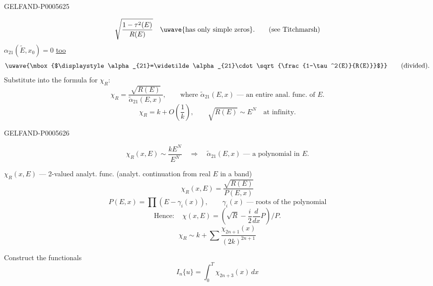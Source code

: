 \begin{GelfandAdjacentEvidence}{GELFAND-P000562}{5}

\[
\sqrt{\frac{1-\tau^2(E)}{R(E)}}\quad
\text{\uwave{has only simple zeros}.}\qquad(\text{see Titchmarsh})
\]
\underline{\(\alpha_{21}(\widetilde E,x_0)=0\)} \underline{too}
\[
\uwave{\mbox{$\displaystyle\alpha_{21}=\widetilde\alpha_{21}\cdot
\sqrt{\frac{1-\tau^2(E)}{R(E)}}$}}\qquad(\text{divided}).
\]
Substitute into the formula for \(\chi_R\):
\[
\chi_R=\frac{\sqrt{R(E)}}{\widetilde\alpha_{21}(E,x)},
\qquad\text{where }\widetilde\alpha_{21}(E,x)\text{ — an entire anal. func. of }E.
\]
\[
\chi_R=k+O\left(\frac1k\right),\qquad
\sqrt{R(E)}\sim E^N\quad\text{at infinity}.
\]
\end{GelfandAdjacentEvidence}
\begin{GelfandAdjacentEvidence}{GELFAND-P000562}{6}

\[
\chi_R(x,E)\sim\frac{kE^N}{E^N}\quad\Rightarrow\quad
\widetilde\alpha_{21}(E,x)\text{ — a polynomial in }E.
\]
\hfill{}\par
\(\chi_R(x,E)\) — 2-valued analyt. func. (analyt. continuation from real \(E\) in a band)
\[
\chi_R(x,E)=\frac{\sqrt{R(E)}}{P(E,x)}
\]
\[
P(E,x)=\prod(E-\gamma_i(x)),\qquad
\gamma_i(x)\text{ — roots of the polynomial}
\]
\[
\text{Hence}:\quad
\boxed{\chi(x,E)=\left(\sqrt R-\frac i2\frac d{dx}P\right)/P.}
\]
\[
\chi_R\sim k+\sum\frac{\chi_{2n+1}(x)}{(2k)^{2n+1}}
\]
\end{GelfandAdjacentEvidence}

Construct the functionals
\[
I_n\{u\}=\int_0^T\chi_{2n+3}(x)\,dx
\]


